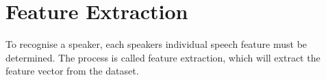 \section*{Feature Extraction}
To recognise a speaker, each speakers individual speech feature must be determined. 
The process is called feature extraction, which will extract the feature vector from the dataset.
